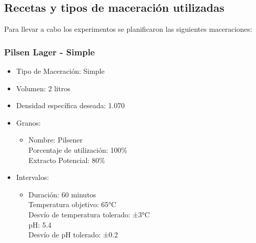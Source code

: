     \begin{minipage}{0.95\textwidth}
    \hfill \break
    \hfill \break
    \subsection{Recetas y tipos de maceración utilizadas}
        \hfill \break
        \par Para llevar a cabo los experimentos se planificaron las siguientes maceraciones:
        \hfill \break
            
            \subsubsection{Pilsen Lager - Simple} 
            
                \begin{itemize}
                    \item Tipo de Maceración: Simple
                    \item Volumen: 2 litros
                    \item Densidad específica deseada: 1.070
                    \item Granos:
                        \begin{itemize}
                            \item Nombre: Pilsener \\
                                Porcentaje de utilización: 100\% \\
                                Extracto Potencial: 80\%
                        \end{itemize}
                    \item Intervalos:
                        \begin{itemize}
                            \item Duración: 60 minutos \\
                             Temperatura objetivo: 65°C \\
                             Desvío de temperatura tolerado: ±3°C \\
                             pH: 5.4 \\
                             Desvío de pH tolerado: ±0.2 \\
                        \end{itemize}
                \end{itemize}
                \end{minipage}
                
